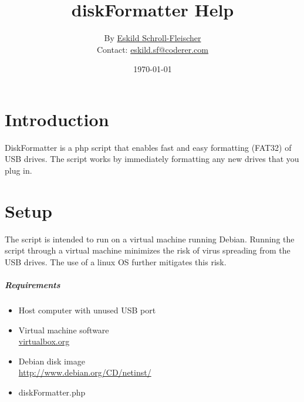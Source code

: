 \documentclass{article}
\begin{document}
\vspace{-5cm}
\author{By \href{mailto:eskild.sf@coderer.com}{Eskild Schroll-Fleischer}\\
Contact: \href{mailto:eskild.sf@coderer.com}{eskild.sf@coderer.com}}
\date{\today}
\title{diskFormatter Help}
\maketitle

\section{Introduction}
DiskFormatter is a php script that enables fast and easy formatting (FAT32) of USB drives.
The script works by immediately formatting any new drives that you plug in.

\section{Setup}
The script is intended to run on a virtual machine running Debian. Running the script through a virtual machine minimizes the risk of virus spreading from the USB drives. The use of a linux OS further mitigates this risk.

\subparagraph{Requirements}
\begin{itemize}
\item Host computer with unused USB port
\item Virtual machine software \\ \url{virtualbox.org}
\item Debian disk image \\ \url{http://www.debian.org/CD/netinst/}
\item diskFormatter.php
\end{itemize}
\end{document}
